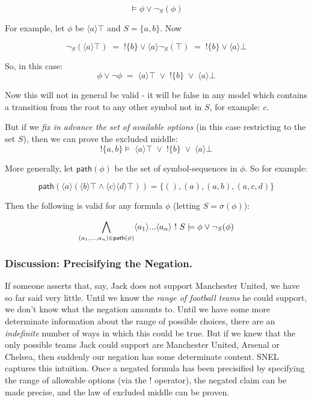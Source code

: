 \[
\models \phi \lor \neg_S(\phi)
\]

\NI For example, let $\phi$ be $\langle a \rangle \top$ and $S = \{a,
b\}$.  Now

\[
\neg_S(\langle a \rangle \top) \; = \; ! \{b\} \lor \langle a \rangle \neg_S(\top) \; =  \; ! \{b\} \lor \langle a \rangle \bot
\]

\NI So, in this case:
\[
\phi \lor \neg \phi \; = \; \langle a \rangle \top \; \lor \; ! \{b\} \; \lor \; \langle a \rangle \bot
\]

\NI Now this will not in general be valid - it will be false in any model
which contains a transition from the root to any other symbol not in
$S$, for example: $c$.

But if we \emph{fix in advance the set of available options} (in this
case restricting to the set $S$), then we can prove the excluded
middle:
\[
!\{a, b\} \models \; \langle a \rangle \top \; \lor \; ! \{b\} \; \lor \; \langle a \rangle \bot
\]

\NI More generally, let $\mathsf{path}(\phi)$ be the set of
symbol-sequences in $\phi$.  So for example:

\[
\mathsf{path}(\langle a \rangle (\langle b \rangle \top \land \langle c \rangle \langle d \rangle \top)) = \{(), (a), (a, b), (a, c, d)\}
\]

\NI Then the following is valid for any formula $\phi$ (letting
$S = \sigma(\phi)$):

\[
\bigwedge_{(a_1, ..., a_n) \in \mathsf{path}(\phi)} \langle a_1 \rangle ... \langle a_n \rangle \ ! \  S \models \phi \lor \neg_S (\phi)
\]

\subsubsection{Discussion: Precisifying the Negation. }

\NI If someone asserts that, say, Jack does not support Manchester United,
we have so far said very little.  Until we know the \emph{range of
  football teams} he could support, we don't know what the negation
amounts to.  Until we have some more determinate information about the
range of possible choices, there are an \emph{indefinite} number of
ways in which this could be true.  But if we knew that the only
possible teams Jack could support are Manchester United, Arsenal or
Chelsea, then suddenly our negation has some determinate content.
SNEL captures this intuition.  Once a negated formula has been
precisified by specifying the range of allowable options (via the $!$
operator), the negated claim can be made precise, and the law of
excluded middle can be proven.

